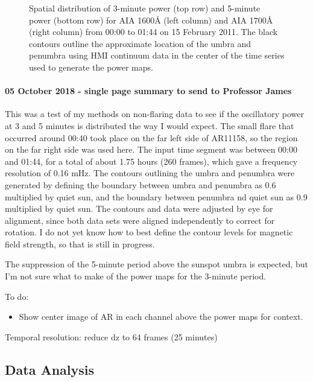 \clearpage
\begin{figure}\centering
    \caption{Spatial distribution of 3-minute power (top row)
    and 5-minute power (bottom row) for
    AIA 1600\AA{} (left column) and AIA 1700\AA{} (right column)
    from 00:00 to 01:44 on 15 February 2011.
    The black contours outline the approximate location of the umbra
    and penumbra using HMI continuum data in the center of the time
    series used to generate the power maps.
    \label{quiet}}
\end{figure}

\paragraph{05 October 2018 - single page summary to send to Professor James}
This was a test of my methods on non-flaring data to see if the
oscillatory power at 3 and 5 minutes is distributed the way I would expect.
The small flare that occurred around 00:40 took place on the far left
side of AR11158, so the region on the far right side was used here.
The input time segment was between 00:00 and 01:44, for a total of
about 1.75 hours (260 frames), which gave a frequency resolution of
0.16 mHz.
The contours outlining the umbra and penumbra were generated by defining
the boundary between umbra and penumbra as 0.6 multiplied by quiet sun,
and the boundary between penumbra nd quiet sun as 0.9 multiplied by quiet sun.
The contours and data were adjusted by eye for alignment, since both data
sets were aligned independently to correct for rotation.
I do not yet know how to best define the contour levels for magnetic field
strength, so that is still in progress.

The suppression of the 5-minute period above the sunspot umbra is expected,
but I'm not sure what to make of the power maps for the 3-minute period.

To do:
\begin{itemize}
    \item Show center image of AR in each channel above the power maps for
        context.
\end{itemize}

\clearpage

Temporal resolution: reduce dz to 64 frames (25 minutes)

\subsection{Data Analysis}

